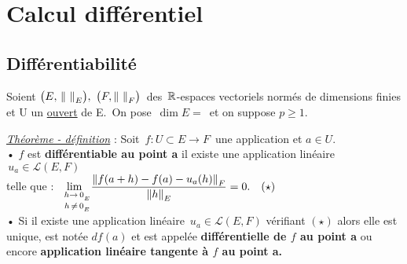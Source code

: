 \section{Calcul différentiel}

\vspace{0.7cm}

\subsection{Différentiabilité}

\vspace{0.7cm}

\begin{center}
    Soient \(\bigl(E,\,\norm{\ }_E\bigr),\ \bigl(F,\norm{\ }_F\bigr)\,\) des \(\,\mathbb{R}\)-espaces vectoriels normés de dimensions finies\vspace{0.1cm}\\
    et U un \underline{ouvert} de E.\, On pose \(\,\dim E=\,\) et on suppose $p\geq 1$.
\end{center}

\vspace{1cm}

\underline{\emph{Théorème - définition}} : Soit \(\, f:U\subset E\to F\,\) une application et \(a\in U.\)\vspace*{0.4cm}\\
• $f$ est \textbf{différentiable au point a} \ssi il existe une application linéaire \(\,u_a\in\mathscr{L}(E,F)\)\vspace{0.15cm}\\
telle que : \(\displaystyle \lim_{\ \; \substack{\vspace{0.05cm}h\to\, 0_{_E} \\ h\,\neq\, 0_{_E}}}\!\frac{\norm{f(a+h)-f(a)-u_a(h)}_F}{\norm{h}_E}=0.\quad (\star)\)\vspace{0.5cm}\\
• Si il existe une application linéaire \(\,u_a\!\in\!\mathscr{L}(E,F)\) vérifiant $(\star)$ alors elle est unique, est notée \(df(a)\) et est appelée \textbf{différentielle de $f$ au point a} ou encore \textbf{application linéaire tangente à $f$ au point a.}

\vspace{1cm}


